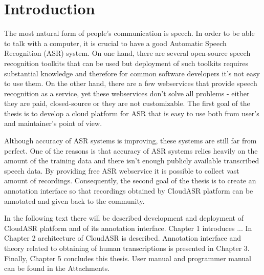 \chapter*{Introduction}

The most natural form of people's communication is speech.
In order to be able to talk with a computer,
  it is crucial to have a good Automatic Speech Recognition (ASR) system.
On one hand, there are several open-source speech recognition toolkits that can be used
  but deployment of such toolkits requires substantial knowledge and therefore
  for common software developers it's not easy to use them.
On the other hand, there are a few webservices that provide speech recognition as a service,
  yet these webservices don't solve all problems -
  either they are paid, closed-source or they are not customizable.
The first goal of the thesis is to develop a cloud platform for ASR
  that is easy to use both from user's and maintainer's point of view.

Although accuracy of ASR systems is improving,
  these systems are still far from perfect.
One of the reasons is that accuracy of ASR systems relies heavily on the amount of the training data
  and there isn't enough publicly available transcribed speech data.
By providing free ASR webservice it is possible to collect vast amount of recordings.
Consequently, the second goal of the thesis is to create an annotation interface
  so that recordings obtained by CloudASR platform can be annotated and given back to the community.

In the following text there will be described development and deployment of CloudASR platform and of its annotation interface.
Chapter 1 introduces ...
In Chapter 2 architecture of CloudASR is described.
Annotation interface and theory related to obtaining of human transcriptions is presented in Chapter 3.
Finally, Chapter 5 concludes this thesis.
User manual and programmer manual can be found in the Attachments.
